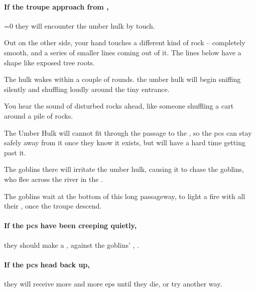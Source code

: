 \begin{multicols}{2}
\paragraph{If the troupe approach from ,}
\ifnum\value{temperature}=0
  they will encounter the umber hulk by touch.

  \begin{boxtext}
    Out on the other side, your hand touches a different kind of rock -- completely smooth, and a series of smaller lines coming out of it.
    The lines below have a shape like exposed tree roots.
  \end{boxtext}

  The hulk wakes within a couple of \glspl{round}.
\else
  the umber hulk will begin sniffing silently and shuffling loudly around the tiny entrance.

  \begin{boxtext}
    You hear the sound of disturbed rocks ahead, like someone shuffling a cart around a pile of rocks.
  \end{boxtext}
\fi

The Umber Hulk will cannot fit through the passage to the , so the \glspl{pc} can stay safely away from it once they know it exists, but will have a hard time getting past it.

\umberhulk

The goblins there will irritate the umber hulk, causing it to chase the goblins, who flee across the river in the .


The goblins wait at the bottom of this long passageway, to light a fire with all their \fireFuel, once the troupe descend.

\paragraph{If the \glspl{pc} have been creeping quietly,}
they should make a , against the goblins' , \tn.

\paragraph{If the \glspl{pc} head back up,}
they will receive more and more \glspl{ep} until they die, or try another way.


\end{multicols}

